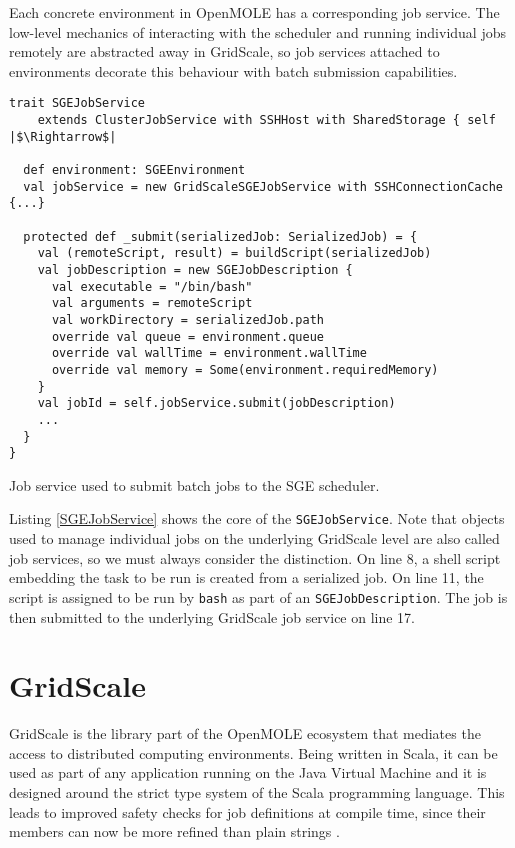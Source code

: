 Each concrete environment in OpenMOLE has a corresponding job service. The low-level mechanics of interacting with the scheduler and running individual jobs remotely are abstracted away in GridScale, so job services attached to environments decorate this behaviour with batch submission capabilities. 

\begin{listing}[h]
	\centering
	\begin{minipage}{14.2cm}
		\begin{verbatim}
trait SGEJobService 
    extends ClusterJobService with SSHHost with SharedStorage { self |$\Rightarrow$|

  def environment: SGEEnvironment
  val jobService = new GridScaleSGEJobService with SSHConnectionCache {...}

  protected def _submit(serializedJob: SerializedJob) = {
    val (remoteScript, result) = buildScript(serializedJob)
    val jobDescription = new SGEJobDescription {
      val executable = "/bin/bash"
      val arguments = remoteScript
      val workDirectory = serializedJob.path
      override val queue = environment.queue
      override val wallTime = environment.wallTime
      override val memory = Some(environment.requiredMemory)
    }
    val jobId = self.jobService.submit(jobDescription)
    ...
  }
}
		\end{verbatim}
	\end{minipage}
	\caption{Job service used to submit batch jobs to the SGE scheduler.}
	\label{SGEJobService}
\end{listing}

Listing \ref{SGEJobService} shows the core of the \verb|SGEJobService|. Note that objects used to manage individual jobs on the underlying GridScale level are also called job services, so we must always consider the distinction. On line 8, a shell script embedding the task to be run is created from a serialized job. On line 11, the script is assigned to be run by \verb|bash| as part of an \verb|SGEJobDescription|. The job is then submitted to the underlying GridScale job service on line 17.

\section{GridScale} \label{GridScaleSection}

GridScale is the library part of the OpenMOLE ecosystem that mediates the access to distributed computing environments. Being written in Scala, it can be used as part of any application running on the Java Virtual Machine and it is designed around the strict type system of the Scala programming language. This leads to improved safety checks for job definitions at compile time, since their members can now be more refined than plain strings \cite{Reuillon2016}.

